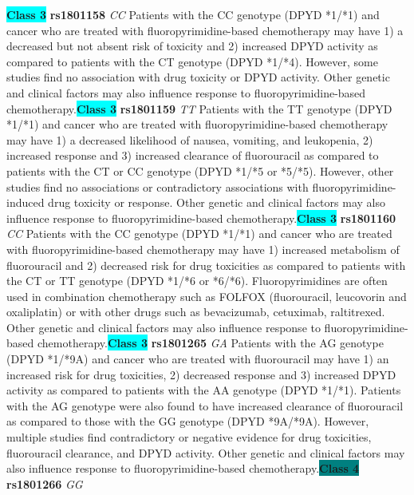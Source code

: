 \documentclass{report}
\begin{document}
\textbf{\colorbox{cyan} {Class 3}} \textbf{ rs1801158 } \textit{ CC }
Patients with the CC genotype (DPYD *1/*1) and cancer who are treated with fluoropyrimidine-based chemotherapy may have 1) a decreased but not absent risk of toxicity and 2) increased DPYD activity as compared to patients with the CT genotype (DPYD *1/*4). However, some studies find no association with drug toxicity or DPYD activity. Other genetic and clinical factors may also influence response to fluoropyrimidine-based chemotherapy.\newline\textbf{\colorbox{cyan} {Class 3}} \textbf{ rs1801159 } \textit{ TT }
Patients with the TT genotype (DPYD *1/*1) and cancer who are treated with fluoropyrimidine-based chemotherapy may have 1) a decreased likelihood of nausea, vomiting, and leukopenia, 2) increased response and 3) increased clearance of fluorouracil as compared to patients with the CT or CC genotype (DPYD *1/*5 or *5/*5). However, other studies find no associations or contradictory associations with fluoropyrimidine-induced drug toxicity or response. Other genetic and clinical factors may also influence response to fluoropyrimidine-based chemotherapy.\newline\textbf{\colorbox{cyan} {Class 3}} \textbf{ rs1801160 } \textit{ CC }
Patients with the CC genotype (DPYD *1/*1) and cancer who are treated with fluoropyrimidine-based chemotherapy may have 1) increased metabolism of fluorouracil and 2) decreased risk for drug toxicities as compared to patients with the CT or TT genotype (DPYD *1/*6 or *6/*6). Fluoropyrimidines are often used in combination chemotherapy such as FOLFOX (fluorouracil, leucovorin and oxaliplatin) or with other drugs such as bevacizumab, cetuximab, raltitrexed. Other genetic and clinical factors may also influence response to fluoropyrimidine-based chemotherapy.\newline\textbf{\colorbox{cyan} {Class 3}} \textbf{ rs1801265 } \textit{ GA }
Patients with the AG genotype (DPYD *1/*9A) and cancer who are treated with fluorouracil may have 1) an increased risk for drug toxicities, 2) decreased response and 3) increased DPYD activity as compared to patients with the AA genotype (DPYD *1/*1). Patients with the AG genotype were also found to have increased clearance of fluorouracil as compared to those with the GG genotype (DPYD *9A/*9A). However, multiple studies find contradictory or negative evidence for drug toxicities, fluorouracil clearance, and DPYD activity. Other genetic and clinical factors may also influence response to fluoropyrimidine-based chemotherapy.\newline\textbf{\colorbox{teal} {Class 4}} \textbf{ rs1801266 } \textit{ GG }
\end{document}

